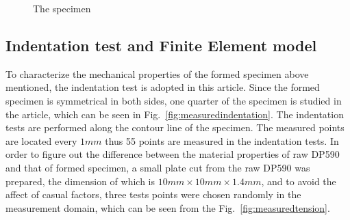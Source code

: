 \documentclass[review]{elsarticle}
\begin{document}
\begin{figure}[h]
\centering
{}


\caption{The specimen}
\label{fig:stampingformedspecimen}
\end{figure}

\subsection{Indentation test and Finite Element model}

To characterize the mechanical properties of the formed specimen above mentioned, the indentation test is adopted in this article. Since the formed specimen is symmetrical in both sides, one quarter of the specimen is studied in the article, which can be seen in Fig.~\ref{fig:measuredindentation}. The indentation tests are performed along the contour line of the specimen. The measured points are located every $1mm$ thus 55 points are measured in the indentation tests. In order to figure out the difference between the material properties of raw DP590 and that of formed specimen, a small plate cut from the raw DP590 was prepared, the dimension of which is $10mm \times 10mm \times 1.4mm$, and to avoid the affect of casual factors, three tests points were chosen randomly in the measurement domain, which can be seen from the Fig.~\ref{fig:measuredtension}.
\end{document}
